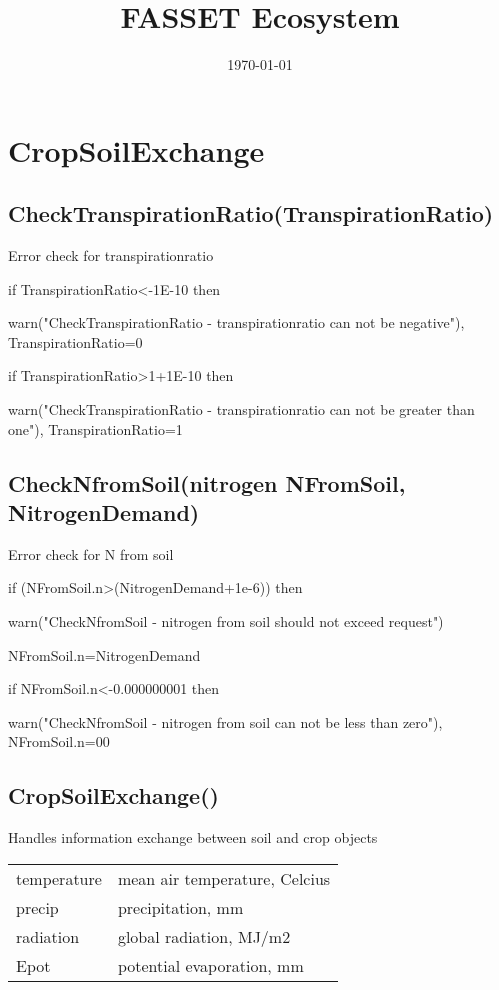 \documentclass[%
]{scrartcl}
\title{FASSET Ecosystem}
\author{}
\date{\today}
\begin{document}
\maketitle
\tableofcontents
\newpage

\section{CropSoilExchange}

\subsection{CheckTranspirationRatio(TranspirationRatio)}
Error check for transpirationratio

if TranspirationRatio<-1E-10 then
    
\quad warn("CheckTranspirationRatio - transpirationratio can not be negative"), TranspirationRatio=0
   
if TranspirationRatio>1+1E-10 then
      
\quad warn("CheckTranspirationRatio - transpirationratio can not be greater than one"), TranspirationRatio=1
   
\subsection{CheckNfromSoil(nitrogen NFromSoil,  NitrogenDemand)}

Error check for N from soil

if (NFromSoil.n>(NitrogenDemand+1e-6)) then
   
\quad    warn("CheckNfromSoil - nitrogen from soil should not exceed request")
    
\quad   NFromSoil.n=NitrogenDemand

if NFromSoil.n<-0.000000001 then

  \quad warn("CheckNfromSoil - nitrogen from soil can not be less than zero"), NFromSoil.n=00


\subsection{CropSoilExchange()}
\citet{berntsen2004modelling}
Handles information exchange between soil and crop objects

\begin{tabular}{ll}
   temperature &       mean air temperature, Celcius \\
   precip  &           precipitation, mm \\
   radiation    &      global radiation, MJ/m2 \\
   Epot   &            potential evaporation, mm
\end{tabular}
\end{document}
